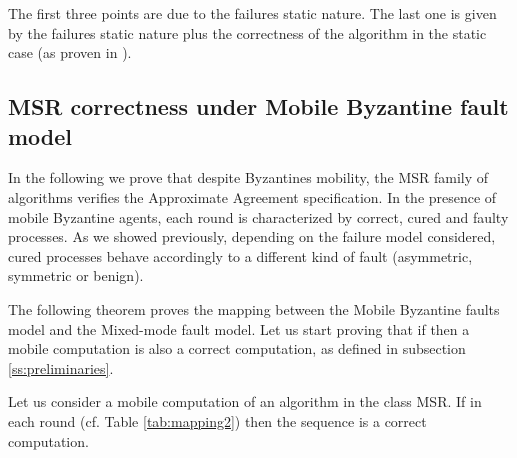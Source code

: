 The first three points are due to the failures static nature. The last one is given by the failures static nature plus the correctness of the algorithm in the static case (as proven in \cite{KA94}).


\subsection{MSR correctness under Mobile Byzantine fault model}
In the following we prove that despite Byzantines mobility, the MSR family of algorithms verifies the Approximate Agreement specification. In the presence of mobile Byzantine agents, each round is characterized by correct, cured and faulty processes. As we showed previously, depending on the failure model considered, cured processes behave accordingly to a different kind of fault (asymmetric, symmetric or benign). 



The following theorem proves the mapping between the Mobile Byzantine faults model and the Mixed-mode fault model. Let us start proving that if  then a mobile computation is also a correct computation, as defined in subsection \ref{ss:preliminaries}.
\begin{theorem}\label{l:mapping}
Let us consider a mobile computation  of an algorithm   in the class MSR. If in each round  (cf. Table \ref{tab:mapping2}) then the sequence  is a correct computation.
\end{theorem}


